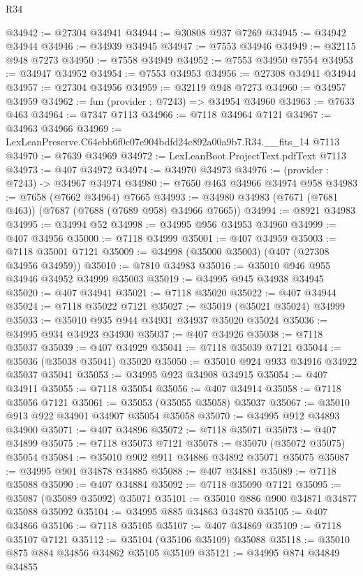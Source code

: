 \begin{lexlean}{R34}
\begin{coremodule}
@34942 := @27304 @34941
@34944 := @30808 @937 @7269
@34945 := @34942 @34944
@34946 := @34939 @34945
@34947 := @7553 @34946
@34949 := @32115 @948 @7273
@34950 := @7558 @34949
@34952 := @7553 @34950 @7554
@34953 := @34947 @34952
@34954 := @7553 @34953
@34956 := @27308 @34941 @34944
@34957 := @27304 @34956
@34959 := @32119 @948 @7273
@34960 := @34957 @34959
@34962 := fun (provider : @7243) => @34954 @34960
@34963 := @7633 @463
@34964 := @7347 @7113
@34966 := @7118 @34964 @7121
@34967 := @34963 @34966
@34969 := LexLeanPreserve.C64ebb6f0c07e904bdfd24c892a00a9b7.R34.__fits_14 @7113
@34970 := @7639 @34969
@34972 := LexLeanBoot.ProjectText.pdfText @7113
@34973 := @407 @34972
@34974 := @34970 @34973
@34976 := (provider : @7243) -> @34967 @34974
@34980 := @7650 @463 @34966 @34974 @958
@34983 := @7658 (@7662 @34964) @7665
@34993 := @34980 @34983 (@7671 (@7681 @463)) (@7687 (@7688 (@7689 @958) @34966 @7665))
@34994 := @8921 @34983
@34995 := @34994 @52
@34998 := @34995 @956 @34953 @34960
@34999 := @407 @34956
@35000 := @7118 @34999
@35001 := @407 @34959
@35003 := @7118 @35001 @7121
@35009 := @34998 (@35000 @35003) (@407 (@27308 @34956 @34959))
@35010 := @7810 @34983
@35016 := @35010 @946 @955 @34946 @34952 @34999 @35003
@35019 := @34995 @945 @34938 @34945
@35020 := @407 @34941
@35021 := @7118 @35020
@35022 := @407 @34944
@35024 := @7118 @35022 @7121
@35027 := @35019 (@35021 @35024) @34999
@35033 := @35010 @935 @944 @34931 @34937 @35020 @35024
@35036 := @34995 @934 @34923 @34930
@35037 := @407 @34926
@35038 := @7118 @35037
@35039 := @407 @34929
@35041 := @7118 @35039 @7121
@35044 := @35036 (@35038 @35041) @35020
@35050 := @35010 @924 @933 @34916 @34922 @35037 @35041
@35053 := @34995 @923 @34908 @34915
@35054 := @407 @34911
@35055 := @7118 @35054
@35056 := @407 @34914
@35058 := @7118 @35056 @7121
@35061 := @35053 (@35055 @35058) @35037
@35067 := @35010 @913 @922 @34901 @34907 @35054 @35058
@35070 := @34995 @912 @34893 @34900
@35071 := @407 @34896
@35072 := @7118 @35071
@35073 := @407 @34899
@35075 := @7118 @35073 @7121
@35078 := @35070 (@35072 @35075) @35054
@35084 := @35010 @902 @911 @34886 @34892 @35071 @35075
@35087 := @34995 @901 @34878 @34885
@35088 := @407 @34881
@35089 := @7118 @35088
@35090 := @407 @34884
@35092 := @7118 @35090 @7121
@35095 := @35087 (@35089 @35092) @35071
@35101 := @35010 @886 @900 @34871 @34877 @35088 @35092
@35104 := @34995 @885 @34863 @34870
@35105 := @407 @34866
@35106 := @7118 @35105
@35107 := @407 @34869
@35109 := @7118 @35107 @7121
@35112 := @35104 (@35106 @35109) @35088
@35118 := @35010 @875 @884 @34856 @34862 @35105 @35109
@35121 := @34995 @874 @34849 @34855

\end{coremodule}
\end{lexlean}

